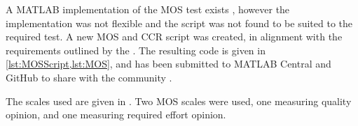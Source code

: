 A MATLAB implementation of the \ac{MOS} test exists \citep{Ruzanski2009},
however the implementation was not flexible and the script was not
found to be suited to the required test. A new \ac{MOS} and \ac{CCR}
script was created, in alignment with the requirements outlined by
the \citet{InternationalTelecommunicationUnion1996}. The resulting
code is given in \cref{lst:MOSScript,lst:MOS}, and has been submitted
to MATLAB Central and GitHub to share with the community \citep{Gillman2014}.

The scales used are given in . Two \ac{MOS}
scales were used, one measuring quality opinion, and one measuring
required effort opinion.

\begin{table}[h]
\protect\caption{\label{tab:MOS-CCR-Scales}Scales used in subjective tests}


\begin{centering}
\par\end{centering}

\begin{centering}
\par\end{centering}


\end{table}
